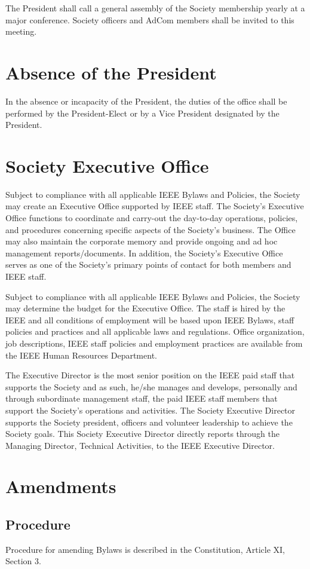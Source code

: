 \documentclass[10pt]{article}
\begin{document}
The President shall call a general assembly of the Society membership yearly at a major conference.  Society officers and AdCom members shall be invited to this meeting.


\section{Absence of the President}

In the absence or incapacity of the President, the duties of the office shall be performed by the President-Elect or by a Vice President designated by the President.

\section{Society Executive Office}

Subject to compliance with all applicable IEEE Bylaws and Policies, the Society may create an Executive Office supported by IEEE staff.  The Society’s Executive Office functions to coordinate and carry-out the day-to-day operations, policies, and procedures concerning specific aspects of the Society’s business.  The Office may also maintain the corporate memory and provide ongoing and ad hoc management reports/documents.  In addition, the Society’s Executive Office serves as one of the Society’s primary points of contact for both members and IEEE staff. 

Subject to compliance with all applicable IEEE Bylaws and Policies, the Society may determine the budget for the Executive Office.  The staff is hired by the IEEE and all conditions of employment will be based upon IEEE Bylaws, staff policies and practices and all applicable laws and regulations.  Office organization, job descriptions, IEEE staff policies and employment practices are available from the IEEE Human Resources Department.  

The Executive Director is the most senior position on the IEEE paid staff that supports the Society and as such, he/she manages and develops, personally and through subordinate management staff, the paid IEEE staff members that support the Society’s operations and activities.  The Society Executive Director supports the Society president, officers and volunteer leadership to achieve the Society goals. This Society Executive Director directly reports through the Managing Director, Technical Activities, to the IEEE Executive Director.


\section{Amendments}

\subsection{Procedure}

Procedure for amending Bylaws is described in the Constitution, Article XI, Section 3. 
\end{document}
